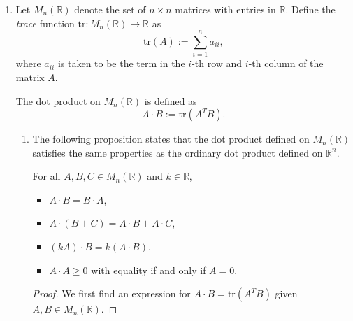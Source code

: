\begin{enumerate}
\begin{enumerate}
\begin{proof}
                    Ergo,
                    \[
                        \lim_{x \to 0} \; \frac{G(x) - 2 \int_0^x \sin(t^3) \, dt}{x^6} = \frac{1}{3}. \qedhere
                    \]
                \end{proof}

        \end{enumerate}

        \bigskip

    \item Let $M_n(\mathbb{R})$ denote the set of $n \times n$ matrices with entries in $\mathbb{R}$.
        Define the \emph{trace} function $\text{tr}: M_n(\mathbb{R}) \to \mathbb{R}$ as
        \[ \text{tr}(A) := \sum_{i = 1}^n a_{ii}, \]
        where $a_{ii}$ is taken to be the term in the $i$-th row and $i$-th column of the matrix $A$.

        The dot product on $M_n(\mathbb{R})$ is defined as
        \[ A \cdot B := \text{tr}(A^T B). \]

        \bigskip

        \begin{enumerate}

            \item The following proposition states that the dot product  defined on $M_n(\mathbb{R})$ satisfies the same properties as the ordinary dot product defined on $\mathbb{R}^n$.

                \medskip

                \begin{proposition} \label{prop:3a}
                    For all $A, B, C \in M_n(\mathbb{R})$ and $k \in \mathbb{R}$,
                    \begin{itemize}
                        \item $A \cdot B = B \cdot A$,
                        \item $A \cdot (B + C) = A \cdot B + A \cdot C$,
                        \item $(k A) \cdot B = k (A \cdot B)$,
                        \item $A \cdot A \ge 0$ with equality if and only if $A = 0$.
                    \end{itemize}
                \end{proposition}

                \smallskip

                \begin{proof}
                    We first find an expression for $A \cdot B = \text{tr}(A^T B)$ given $A, B \in M_n(\mathbb{R})$.


\end{proof}
\end{enumerate}
\end{enumerate}
